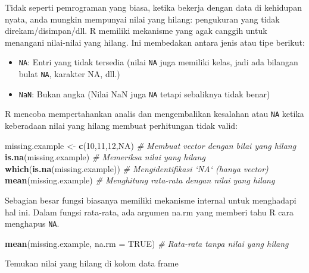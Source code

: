 \documentclass[
]{book}
\newenvironment{Shaded}{\begin{snugshade}}{\end{snugshade}}
\newcommand{\CommentTok}[1]{\textcolor[rgb]{0.56,0.35,0.01}{\textit{#1}}}
\newcommand{\DataTypeTok}[1]{\textcolor[rgb]{0.13,0.29,0.53}{#1}}
\newcommand{\DecValTok}[1]{\textcolor[rgb]{0.00,0.00,0.81}{#1}}
\newcommand{\KeywordTok}[1]{\textcolor[rgb]{0.13,0.29,0.53}{\textbf{#1}}}
\newcommand{\NormalTok}[1]{#1}
\newcommand{\OtherTok}[1]{\textcolor[rgb]{0.56,0.35,0.01}{#1}}
\newcommand{\StringTok}[1]{\textcolor[rgb]{0.31,0.60,0.02}{#1}}
\providecommand{\tightlist}{%
  \setlength{\itemsep}{0pt}\setlength{\parskip}{0pt}}
\begin{document}
Tidak seperti pemrograman yang biasa, ketika bekerja dengan data di kehidupan nyata, anda mungkin mempunyai nilai yang hilang: pengukuran yang tidak direkam/disimpan/dll. R memiliki mekanisme yang agak canggih untuk menangani nilai-nilai yang hilang. Ini membedakan antara jenis atau tipe berikut:

\begin{itemize}
\tightlist
\item
  \texttt{NA}: Entri yang tidak tersedia (nilai \texttt{NA} juga memiliki kelas, jadi ada bilangan bulat \texttt{NA}, karakter NA, dll.)
\item
  \texttt{NaN}: Bukan angka (Nilai NaN juga \texttt{NA} tetapi sebaliknya tidak benar)
\end{itemize}

R mencoba mempertahankan analis dan mengembalikan kesalahan atau \texttt{NA} ketika keberadaan nilai yang hilang membuat perhitungan tidak valid:

\begin{Shaded}
\begin{Highlighting}[]
\NormalTok{missing.example <-}\StringTok{ }\KeywordTok{c}\NormalTok{(}\DecValTok{10}\NormalTok{,}\DecValTok{11}\NormalTok{,}\DecValTok{12}\NormalTok{,}\OtherTok{NA}\NormalTok{)                }\CommentTok{# Membuat vector dengan bilai yang hilang}
\KeywordTok{is.na}\NormalTok{(missing.example)                           }\CommentTok{# Memeriksa nilai yang hilang}
\KeywordTok{which}\NormalTok{(}\KeywordTok{is.na}\NormalTok{(missing.example))                    }\CommentTok{# Mengidentifikasi `NA` (hanya vector)}
\KeywordTok{mean}\NormalTok{(missing.example)                            }\CommentTok{# Menghitung rata-rata dengan nilai yang hilang}
\end{Highlighting}
\end{Shaded}

Sebagian besar fungsi biasanya memiliki mekanisme internal untuk menghadapi hal ini. Dalam fungsi rata-rata, ada argumen na.rm yang memberi tahu R cara menghapus \texttt{NA}.

\begin{Shaded}
\begin{Highlighting}[]
\KeywordTok{mean}\NormalTok{(missing.example, }\DataTypeTok{na.rm =} \OtherTok{TRUE}\NormalTok{)               }\CommentTok{# Rata-rata tanpa nilai yang hilang}
\end{Highlighting}
\end{Shaded}

Temukan nilai yang hilang di kolom data frame
\end{document}
